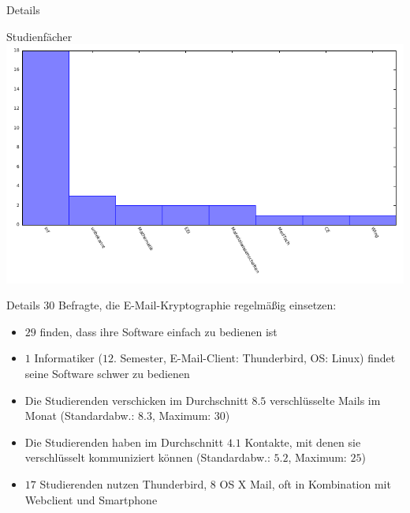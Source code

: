 \documentclass[]{beamer}
\begin{document}
\begin{frame}{Details}
	\begin{center}
		Studienfächer
		\includegraphics[scale=0.9]{plots/reglm.pdf}
	\end{center}
\end{frame}

\begin{frame}{Details}
	$30$ Befragte, die E-Mail-Kryptographie regelmäßig einsetzen:
  \begin{itemize}
	\item<2-> $29$ finden, dass ihre Software einfach zu bedienen ist
	\item<2-> $1$ Informatiker ($12.$ Semester, E-Mail-Client: Thunderbird, OS: Linux) findet seine Software schwer zu bedienen
	\item<3-> Die Studierenden verschicken im Durchschnitt $8.5$ verschlüsselte Mails im Monat (Standardabw.: $8.3$, Maximum: $30$)
	\item<4-> Die Studierenden haben im Durchschnitt $4.1$ Kontakte, mit denen sie verschlüsselt kommuniziert können
		(Standardabw.: $5.2$, Maximum: $25$)
	\item<5-> $17$ Studierenden nutzen Thunderbird, $8$ OS X Mail, oft in Kombination mit Webclient und Smartphone
  \end{itemize}
\end{frame}


\end{document}

